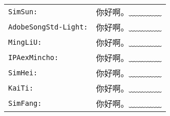 \documentclass{article}
\def\kenten#1{\texttt{#1:}&{\jfontspec{#1}你好啊。\kern-4\zw ﹏﹏﹏﹏}}
\begin{document}
\begin{tabular}{ll}
\kenten{SimSun}\\
\kenten{AdobeSongStd-Light}\\
\kenten{MingLiU}\\
\kenten{IPAexMincho}\\
\kenten{SimHei}\\
\kenten{KaiTi}\\
\kenten{SimFang}\\
\end{tabular}
\end{document}
